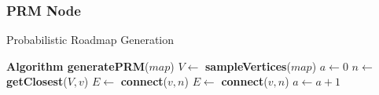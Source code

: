 \documentclass[conference]{IEEEtran}
\begin{document}
\subsubsection{PRM Node}
\begin{algorithm}
  \caption{Probabilistic Roadmap Generation}
  \label{alg:prm}
  \begin{algorithmic}[1]
    \State \textbf{Algorithm generatePRM}\textnormal{($map$)}
    \State $V \leftarrow $\textbf{ sampleVertices}\textnormal{($map$)}
    \State $a \leftarrow 0$
    \State $n \leftarrow$\textbf{ getClosest}\textnormal{($V, v$)}
    \State $E \leftarrow$\textbf{ connect}\textnormal{($v, n$)}
    \EndIf
    \State $E \leftarrow$\textbf{ connect}\textnormal{($v, n$)}
    \EndIf
    \State $a \leftarrow a + 1$
    \EndWhile
    \EndFor
  \end{algorithmic}
\end{algorithm}
\end{document}
